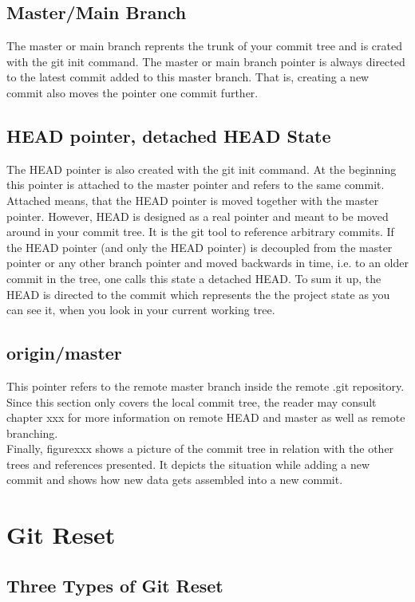 \subsection*{Master/Main Branch}
The master or main branch reprents the trunk of your commit tree and is crated 
with the git init command. The master or main branch pointer is always directed to the latest commit added to 
this master branch. That is, creating a new commit also moves the pointer one commit further.

\subsection*{HEAD pointer, detached HEAD State}
The HEAD pointer is also created with the git init command. At the beginning this pointer is attached to 
the master pointer and refers to the same commit. Attached means, that the HEAD pointer is moved together 
with the master pointer. However, HEAD is designed as a real pointer and meant to be moved around in 
your commit tree. It is the git tool to reference arbitrary commits.
If the HEAD pointer (and only the HEAD pointer) is decoupled from the master pointer or any other branch pointer and moved backwards in time, i.e. to an older 
commit in the tree, one calls this state a detached HEAD.
To sum it up, the HEAD is directed to the commit which represents the the project state as you can see it, when you 
look in your current working tree.

\subsection*{origin/master} 
This pointer refers to the remote master branch inside the remote .git repository. Since this section only 
covers the local commit tree, the reader may consult chapter xxx for more information on remote HEAD and master
as well as remote branching. 
\\
Finally, figurexxx shows a picture of the commit tree in relation with the other trees and references
presented. It depicts the situation while adding a new commit and shows how new data gets assembled into a new commit.



\section{Git Reset}
\label{chapter:2.2}

\subsection{Three Types of Git Reset}
\label{chapter:2.2.1}

